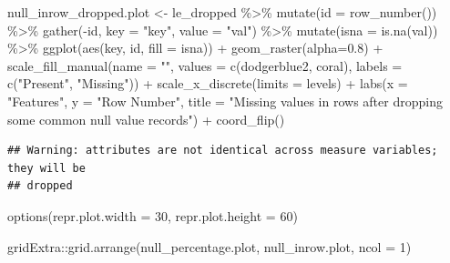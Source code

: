 \documentclass[
]{article}
\newenvironment{Shaded}{\begin{snugshade}}{\end{snugshade}}
\newcommand{\AttributeTok}[1]{\textcolor[rgb]{0.77,0.63,0.00}{#1}}
\newcommand{\DecValTok}[1]{\textcolor[rgb]{0.00,0.00,0.81}{#1}}
\newcommand{\FloatTok}[1]{\textcolor[rgb]{0.00,0.00,0.81}{#1}}
\newcommand{\FunctionTok}[1]{\textcolor[rgb]{0.00,0.00,0.00}{#1}}
\newcommand{\NormalTok}[1]{#1}
\newcommand{\OtherTok}[1]{\textcolor[rgb]{0.56,0.35,0.01}{#1}}
\newcommand{\SpecialCharTok}[1]{\textcolor[rgb]{0.00,0.00,0.00}{#1}}
\newcommand{\StringTok}[1]{\textcolor[rgb]{0.31,0.60,0.02}{#1}}
\begin{document}
\begin{Shaded}
\begin{Highlighting}[]
\NormalTok{null\_inrow\_dropped.plot }\OtherTok{\textless{}{-}}\NormalTok{ le\_dropped }\SpecialCharTok{\%\textgreater{}\%}
  \FunctionTok{mutate}\NormalTok{(}\AttributeTok{id =} \FunctionTok{row\_number}\NormalTok{()) }\SpecialCharTok{\%\textgreater{}\%}
  \FunctionTok{gather}\NormalTok{(}\SpecialCharTok{{-}}\NormalTok{id, }\AttributeTok{key =} \StringTok{"key"}\NormalTok{, }\AttributeTok{value =} \StringTok{"val"}\NormalTok{) }\SpecialCharTok{\%\textgreater{}\%}
  \FunctionTok{mutate}\NormalTok{(}\AttributeTok{isna =} \FunctionTok{is.na}\NormalTok{(val)) }\SpecialCharTok{\%\textgreater{}\%}
  \FunctionTok{ggplot}\NormalTok{(}\FunctionTok{aes}\NormalTok{(key, id, }\AttributeTok{fill =}\NormalTok{ isna)) }\SpecialCharTok{+}
    \FunctionTok{geom\_raster}\NormalTok{(}\AttributeTok{alpha=}\FloatTok{0.8}\NormalTok{) }\SpecialCharTok{+}
    \FunctionTok{scale\_fill\_manual}\NormalTok{(}\AttributeTok{name =} \StringTok{""}\NormalTok{,}
        \AttributeTok{values =} \FunctionTok{c}\NormalTok{(}\StringTok{\textquotesingle{}dodgerblue2\textquotesingle{}}\NormalTok{, }\StringTok{\textquotesingle{}coral\textquotesingle{}}\NormalTok{),}
        \AttributeTok{labels =} \FunctionTok{c}\NormalTok{(}\StringTok{"Present"}\NormalTok{, }\StringTok{"Missing"}\NormalTok{)) }\SpecialCharTok{+}
    \FunctionTok{scale\_x\_discrete}\NormalTok{(}\AttributeTok{limits =}\NormalTok{ levels) }\SpecialCharTok{+}
    \FunctionTok{labs}\NormalTok{(}\AttributeTok{x =} \StringTok{"Features"}\NormalTok{, }\AttributeTok{y =} \StringTok{"Row Number"}\NormalTok{, }\AttributeTok{title =} \StringTok{"Missing values in rows after dropping some common null value records"}\NormalTok{) }\SpecialCharTok{+}
    \FunctionTok{coord\_flip}\NormalTok{()}
\end{Highlighting}
\end{Shaded}

\begin{verbatim}
## Warning: attributes are not identical across measure variables; they will be
## dropped
\end{verbatim}

\begin{Shaded}
\begin{Highlighting}[]
\FunctionTok{options}\NormalTok{(}\AttributeTok{repr.plot.width =} \DecValTok{30}\NormalTok{, }\AttributeTok{repr.plot.height =} \DecValTok{60}\NormalTok{)}

\NormalTok{gridExtra}\SpecialCharTok{::}\FunctionTok{grid.arrange}\NormalTok{(null\_percentage.plot, null\_inrow.plot, }\AttributeTok{ncol =} \DecValTok{1}\NormalTok{)}
\end{Highlighting}
\end{Shaded}
\end{document}
